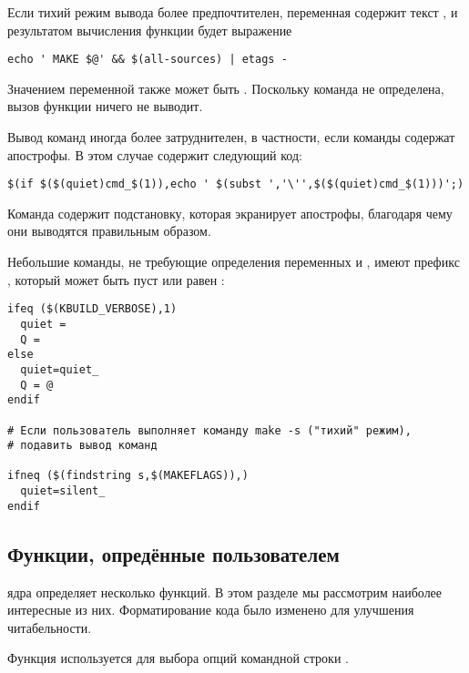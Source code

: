Если тихий режим вывода более предпочтителен, переменная
 содержит текст , и результатом
вычисления функции будет выражение

\begin{verbatim}
echo ' MAKE $@' && $(all-sources) | etags -
\end{verbatim}

Значением переменной также может быть . Поскольку команда
 не определена, вызов функции  ничего
не выводит.

Вывод команд иногда более затруднителен, в частности, если команды содержат
апострофы. В этом случае \Makefile{} содержит следующий код:

\begin{verbatim}
$(if $($(quiet)cmd_$(1)),echo ' $(subst ','\'',$($(quiet)cmd_$(1)))';)
\end{verbatim}

Команда  содержит подстановку, которая экранирует апострофы,
благодаря чему они выводятся правильным образом.

Небольшие команды, не требующие определения переменных 
и , имеют префикс , который может
быть пуст или равен :

\begin{verbatim}
ifeq ($(KBUILD_VERBOSE),1)
  quiet =
  Q =
else
  quiet=quiet_
  Q = @
endif

# Если пользователь выполняет команду make -s ("тихий" режим),
# подавить вывод команд

ifneq ($(findstring s,$(MAKEFLAGS)),)
  quiet=silent_
endif
\end{verbatim}

\subsection{Функции, опредённые пользователем}

\Makefile{} ядра определяет несколько функций. В этом разделе мы
рассмотрим наиболее интересные из них. Форматирование кода было
изменено для улучшения читабельности.

Функция  используется для выбора опций
командной строки .

